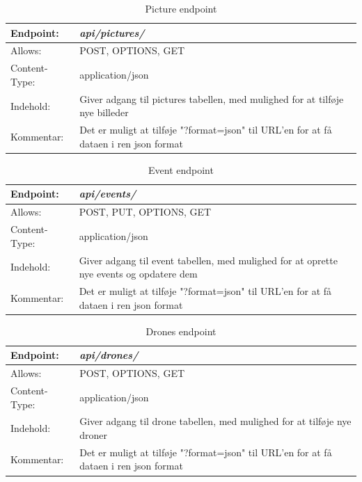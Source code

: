 \begin{table}[H]
\begin{tabular}{| p{3cm}| p{11.5cm}|}
\hline
Endpoint:	 							&\textbf{\textit{api/pictures/}} \\\hline
Allows:									& POST, OPTIONS, GET\\\hline
Content-Type:						& application/json\\\hline 
Indehold:								& Giver adgang til pictures tabellen, med mulighed for at tilføje nye billeder\\\hline 
Kommentar:							& Det er muligt at tilføje "?format=json" til URL'en for at få dataen i ren json format\\\hline
\end{tabular}
\caption{Picture endpoint}
\label{picture_endpoint}
\end{table}

\begin{table}[H]
\begin{tabular}{| p{3cm}| p{11.5cm}|}
\hline
Endpoint:	 							&\textbf{\textit{api/events/}}\\\hline
Allows:									& POST, PUT, OPTIONS, GET\\\hline
Content-Type:						& application/json\\\hline 
Indehold:								& Giver adgang til event tabellen, med mulighed for at oprette nye events og opdatere dem\\\hline 
Kommentar:							& Det er muligt at tilføje "?format=json" til URL'en for at få dataen i ren json format\\\hline
\end{tabular}
\caption{Event endpoint}
\label{event_endpoint}
\end{table}

\begin{table}[H]
\begin{tabular}{| p{3cm}| p{11.5cm}|}
\hline
Endpoint:	 							&\textbf{\textit{api/drones/}}\\\hline
Allows:									& POST, OPTIONS, GET\\\hline
Content-Type:						& application/json\\\hline 
Indehold:								& Giver adgang til drone tabellen, med mulighed for at tilføje nye droner\\\hline 
Kommentar:							& Det er muligt at tilføje "?format=json" til URL'en for at få dataen i ren json format\\\hline
\end{tabular}
\caption{Drones endpoint}
\label{drones_endpoint}
\end{table}

